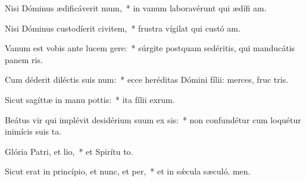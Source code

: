 \item Nisi Dóminus ædificáverit mum,~* in vanum laboravérunt qui ædífi am.
\item Nisi Dóminus custodíerit civitem,~* frustra vígilat qui custó am.
\item Vanum est vobis ante lucem gere:~* súrgite postquam sedéritis, qui manducátis panem ris.
\item Cum déderit diléctis suis num:~* ecce heréditas Dómini fílii: merces, fruc tris.
\item Sicut sagíttæ in manu pottis:~* ita fílii exrum.
\item Beátus vir qui implévit desidérium suum ex sis:~* non confundétur cum loquétur inimícis suis  ta.
\item Glória Patri, et lio,~* et Spirítu to.
\item Sicut erat in princípio, et nunc, et per,~* et in sǽcula sæculó. men.
